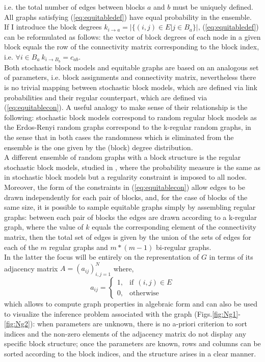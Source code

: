 \documentclass[%
 reprint,
 amsmath,amssymb,
 aps,
 pre,
 showpacs
]{revtex4-1}
\begin{document}
i.e. the total number of edges between blocks $a$ and $b$ must be uniquely defined. \\
All graphs satisfying (\ref{eq:equitabledef}) have equal probability in the ensemble. \\
If I introduce the block degrees $k_{i\rightarrow a} =  |\{(i,j) \in E | j \in B_a \}| $, (\ref{eq:equitabledef}) can be reformulated as follows: the vector of block degrees of each node in a given block equals the row of the connectivity matrix corresponding to the block index, i.e. $\forall i \in B_a\:k_{i\rightarrow B_b} = c_{ab}$.  \\
Both stochastic block models and equitable graphs are based on an analogous set of parameters, i.e. block assignments and connectivity matrix, nevertheless there is no trivial mapping between stochastic block models, which are defined via link probabilities and their regular counterpart, which are defined via (\ref{eq:equitablecon}).
A useful analogy to make sense of their relationship is the following: stochastic block models \cite{holland1983stochastic} correspond to random regular block models as the Erdos-Renyi random graphs correspond to the k-regular random graphs, in the sense that in both cases the randomness which is eliminated from the ensemble is the one given by the (block) degree distribution. \\
A different ensemble of random graphs with a block structure is the regular stochastic block models, studied in \cite{decelle2011inference, kawamoto2015limitations}, where the probability measure is the same as in stochastic block models but a regularity constraint is imposed to all nodes.\\ 
Moreover, the form of the constraints in (\ref{eq:equitablecon}) allow edges to be drawn independently for each pair of blocks, and, for the case of blocks of the same size, it is possible to sample equitable graphs simply by assembling regular graphs: between each pair of blocks the edges are drawn according to a k-regular graph, where the value of $k$ equals the corresponding element of the connectivity matrix, then the total set of edges is given by the union of the sets of edges for each of the $m$ regular graphs and $m*(m-1)$ bi-regular graphs. \\
In the latter the focus will be entirely on the representation of $G$ in terms of its adjacency matrix $A=(a_{ij})_{i,j=1}^N$ where,
\[
    a_{ij} = \begin{cases}
        1, & \text{if}\:\:(i,j)\in E\\
        0, & \text{otherwise}
        \end{cases}
  \]
which allows to compute graph properties in algebraic form and can also be used to visualize the inference problem associated with the graph (Figs.\ref{fig:Ng1}-\ref{fig:Ng2}): when parameters are unknown, there is no a-priori criterion to sort indices and the non-zero elements of the adjacency matrix do not display any specific block structure; once the parameters are known, rows and columns can be sorted according to the block indices, and the structure arises in a clear manner.\\
\end{document}
